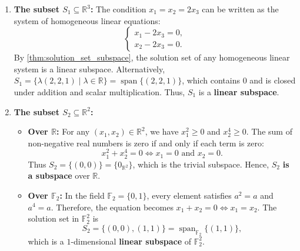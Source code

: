 \begin{exercisesolution*}
\label{sol:verifying_subspaces_r_f2}
\begin{enumerate}[label=\textbf{(\alph*)}]
    \item \textbf{The subset $S_1 \subseteq \mathbb{R}^3$:}
    The condition $x_1 = x_2 = 2x_3$ can be written as the system of homogeneous linear equations:
    \[
    \begin{cases}
    x_1 - 2x_3 = 0, \\
    x_2 - 2x_3 = 0.
    \end{cases}
    \]
    By \cref{thm:solution_set_subspace}, the solution set of any homogeneous linear system is a linear subspace. Alternatively, $S_1 = \{\lambda(2, 2, 1) \mid \lambda \in \mathbb{R}\} = \operatorname{span}\{(2, 2, 1)\}$, which contains $0$ and is closed under addition and scalar multiplication. Thus, $S_1$ is a \textbf{linear subspace}.

    \item \textbf{The subset $S_2 \subseteq \mathbb{R}^2$:}
    \begin{itemize}
        \item \textbf{Over $\mathbb{R}$:} For any $(x_1, x_2) \in \mathbb{R}^2$, we have $x_1^2 \ge 0$ and $x_2^4 \ge 0$. The sum of non-negative real numbers is zero if and only if each term is zero:
        \[
        x_1^2 + x_2^4 = 0 \iff x_1 = 0 \text{ and } x_2 = 0.
        \]
        Thus $S_2 = \{(0, 0)\} = \{0_{\mathbb{R}^2}\}$, which is the trivial subspace. Hence, $S_2$ \textbf{is a subspace} over $\mathbb{R}$.
        \item \textbf{Over $\mathbb{F}_2$:} In the field $\mathbb{F}_2 = \{0, 1\}$, every element satisfies $a^2 = a$ and $a^4 = a$. Therefore, the equation becomes $x_1 + x_2 = 0 \iff x_1 = x_2$. The solution set in $\mathbb{F}_2^2$ is
        \[
        S_2 = \{(0, 0), (1, 1)\} = \operatorname{span}_{\mathbb{F}_2}\{(1, 1)\},
        \]
        which is a $1$-dimensional \textbf{linear subspace} of $\mathbb{F}_2^2$.
    \end{itemize}


\end{enumerate}
\end{exercisesolution*}
